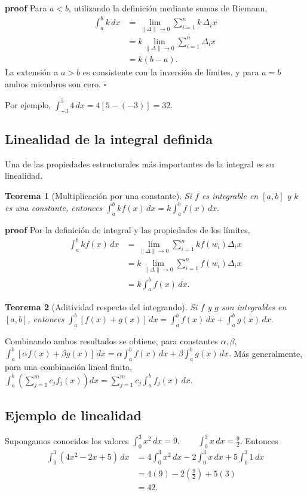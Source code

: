 \documentclass[12pt]{article}
\newtheorem{Teo}{Teorema}
\begin{document}
\textbf{proof}
Para $a<b$, utilizando la definición mediante sumas de Riemann,
\begin{align*}
\int_a^b k\,dx
&=\lim_{\|\Delta\|\to0}\sum_{i=1}^n k\,\Delta_i x\\
&=k\lim_{\|\Delta\|\to0}\sum_{i=1}^n\Delta_i x\\
&=k(b-a).
\end{align*}
La extensión a $a>b$ es consistente con la inversión de límites, y para $a=b$
ambos miembros son cero.
\hfill$\square$

Por ejemplo,
$
\int_{-3}^{5}4\,dx=4[5-(-3)]=\boxed{32}.
$
\subsection*{Linealidad de la integral definida}
Una de las propiedades estructurales más importantes de la integral es su
linealidad.

\begin{Teo}[Multiplicación por una constante]
Si $f$ es integrable en $[a,b]$ y $k$ es una constante, entonces
$
\boxed{
\int_a^b kf(x)\,dx=k\int_a^b f(x)\,dx.
}
$
\end{Teo}

\textbf{proof}
Por la definición de integral y las propiedades de los límites,
\begin{align*}
\int_a^b kf(x)\,dx
&=\lim_{\|\Delta\|\to0}\sum_{i=1}^n kf(w_i)\Delta_i x\\
&=k\lim_{\|\Delta\|\to0}\sum_{i=1}^n f(w_i)\Delta_i x\\
&=k\int_a^b f(x)\,dx.
\end{align*}


\begin{Teo}[Aditividad respecto del integrando]
Si $f$ y $g$ son integrables en $[a,b]$, entonces
$
\boxed{
\int_a^b[f(x)+g(x)]\,dx
=\int_a^b f(x)\,dx+\int_a^b g(x)\,dx.
}
$
\end{Teo}

Combinando ambos resultados se obtiene, para constantes $\alpha,\beta$,
$
\boxed{
\int_a^b[\alpha f(x)+\beta g(x)]\,dx
=\alpha\int_a^b f(x)\,dx
+\beta\int_a^b g(x)\,dx.
}
$
Más generalmente, para una combinación lineal finita,
$
\int_a^b\left(\sum_{j=1}^m c_jf_j(x)\right)dx
=\sum_{j=1}^m c_j\int_a^b f_j(x)\,dx.
$

\subsection*{Ejemplo de linealidad}
Supongamos conocidos los valores
$
\int_0^3x^2\,dx=9,
\qquad
\int_0^3x\,dx=\frac92.
$
Entonces
\begin{align*}
\int_0^3(4x^2-2x+5)\,dx
&=4\int_0^3x^2\,dx-2\int_0^3x\,dx+5\int_0^3 1\,dx\\
&=4(9)-2\left(\frac92\right)+5(3)\\
&=\boxed{42}.
\end{align*}
\end{document}
